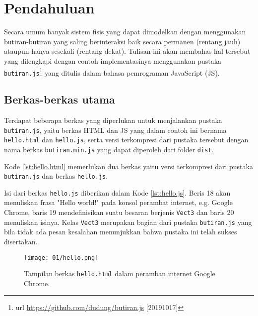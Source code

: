 \setcounter{chapter}{0}
\setcounter{page}{1}


\chapter{Pendahuluan}
Secara umum banyak sistem fisis yang dapat dimodelkan dengan menggunakan butiran-butiran yang saling berinteraksi baik secara permanen (rentang jauh) ataupun hanya sesekali (rentang dekat). Tulisan ini akan membahas hal tersebut yang dilengkapi dengan contoh implementasinya menggunakan pustaka \verb|butiran.js|\footnote{url \url{https://github.com/dudung/butiran.js} [20191017]} yang ditulis dalam bahasa pemrograman JavaScript (JS).


%
\section{Berkas-berkas utama}
Terdapat beberapa berkas yang diperlukan untuk menjalankan pustaka \verb|butiran.js|, yaitu berkas HTML dan JS yang dalam contoh ini bernama \verb|hello.html| dan \verb|hello.js|, serta versi terkompresi dari pustaka tersebut dengan nama berkas \verb|butiran.min.js| yang dapat diperoleh dari folder \verb|dist|.



Kode \ref{lst:hello.html} memerlukan dua berkas yaitu versi terkompresi dari pustaka \verb|butiran.js| dan berkas \verb|hello.js|.



Isi dari berkas \verb|hello.js| diberikan dalam Kode \ref{lst:hello.js}. Beris 18 akan menuliskan frasa "Hello world!" pada konsol perambat internet, e.g. Google Chrome, baris 19 mendefinisikan suatu besaran berjenis \verb|Vect3| dan baris 20 menuliskan isinya. Kelas \verb|Vect3| merupakan bagian dari pustaka \verb|butiran.js| yang bila tidak ada pesan kesalahan menunjukkan bahwa pustaka ini telah sukses disertakan.

\begin{figure}[H]
\centering
\texttt{[image: 01/hello.png]}
\caption{\label{fig:hello} Tampilan berkas {\tt hello.html} dalam peramban internet Google Chrome.}
\end{figure}

